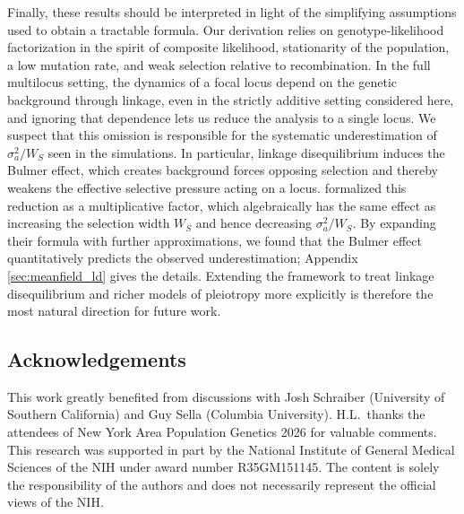 \documentclass[10pt]{article}
\begin{document}
Finally, these results should be interpreted in light of the simplifying assumptions used to obtain a tractable formula. Our derivation relies on genotype-likelihood factorization in the spirit of composite likelihood, stationarity of the population, a low mutation rate, and weak selection relative to recombination. In the full multilocus setting, the dynamics of a focal locus depend on the genetic background through linkage, even in the strictly additive setting considered here, and ignoring that dependence lets us reduce the analysis to a single locus. We suspect that this omission is responsible for the systematic underestimation of $\sigma_a^2/W_S$ seen in the simulations. In particular, linkage disequilibrium induces the Bulmer effect, which creates background forces opposing selection and thereby weakens the effective selective pressure acting on a locus. \citet{Negm_2026} formalized this reduction as a multiplicative factor, which algebraically has the same effect as increasing the selection width $W_S$ and hence decreasing $\sigma_a^2/W_S$. By expanding their formula with further approximations, we found that the Bulmer effect quantitatively predicts the observed underestimation; Appendix \ref{sec:meanfield_ld} gives the details. Extending the framework to treat linkage disequilibrium and richer models of pleiotropy more explicitly is therefore the most natural direction for future work.


\subsection*{Acknowledgements}
This work greatly benefited from discussions with Josh Schraiber (University of Southern California) and Guy Sella (Columbia University). 
H.L.~thanks the attendees of New York Area Population Genetics 2026 for valuable comments.
This research was supported in part by the National Institute of General Medical Sciences of the
NIH under award number R35GM151145. The content is solely the responsibility of the authors
and does not necessarily represent the official views of the NIH.

\printbibliography

\newpage

\appendix
\setcounter{figure}{0}
\setcounter{equation}{0}

\renewcommand{\thefigure}{A\arabic{figure}}
\renewcommand{\thetable}{A\arabic{table}}
\renewcommand{\theequation}{A\arabic{equation}}
\renewcommand{\theHfigure}{A\arabic{figure}}
\renewcommand{\theHtable}{A\arabic{table}}
\renewcommand{\theHequation}{A\arabic{equation}}
\end{document}
